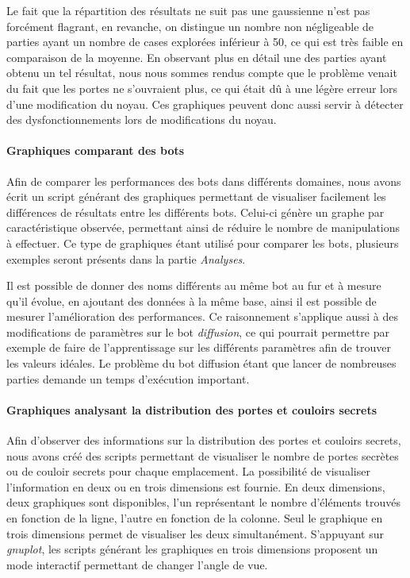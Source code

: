 \documentclass[a4paper,12pt]{article}
\begin{document}
Le fait que la répartition des résultats ne suit pas une gaussienne n'est pas
forcément flagrant, en revanche, on distingue un nombre non négligeable de
parties ayant un nombre de cases explorées inférieur à 50, ce qui est très
faible en comparaison de la moyenne. En observant plus en détail une des
parties ayant obtenu un tel résultat, nous nous sommes rendus compte que le
problème venait du fait que les portes ne s'ouvraient plus, ce qui était dû à
une légère erreur lors d'une modification du noyau. Ces graphiques peuvent
donc aussi servir à détecter des dysfonctionnements lors de modifications du
noyau.

\paragraph{Graphiques comparant des bots}
Afin de comparer les performances des bots dans différents domaines, nous
avons écrit un script générant des graphiques permettant de visualiser
facilement les différences de résultats entre les différents bots. Celui-ci
génère un graphe par caractéristique observée, permettant ainsi de réduire le
nombre de manipulations à effectuer. Ce type de graphiques étant utilisé pour
comparer les bots, plusieurs exemples seront présents dans la partie
{\em Analyses}.

Il est possible de donner des noms différents au même bot au fur et à mesure
qu'il évolue, en ajoutant des données à la même base, ainsi il est possible de
mesurer l'amélioration des performances. Ce raisonnement s'applique aussi à
des modifications de paramètres sur le bot {\em diffusion}, ce qui
pourrait permettre par exemple de faire de l'apprentissage sur les différents
paramètres afin de trouver les valeurs idéales. Le problème du bot diffusion
étant que lancer de nombreuses parties demande un temps d'exécution important.

\paragraph{Graphiques analysant la distribution des portes et couloirs secrets}
Afin d'observer des informations sur la distribution des portes et couloirs
secrets, nous avons créé des scripts permettant de visualiser le nombre de
portes secrètes ou de couloir secrets pour chaque emplacement. La possibilité de
visualiser l'information en deux ou en trois dimensions est fournie. En deux
dimensions, deux graphiques sont disponibles, l'un représentant le nombre
d'éléments trouvés en fonction de la ligne, l'autre en fonction de la colonne.
Seul le graphique en trois dimensions permet de visualiser les deux
simultanément. S'appuyant sur {\em gnuplot}, les scripts générant les graphiques
en trois dimensions proposent un mode interactif permettant de changer l'angle
de vue.
\end{document}
